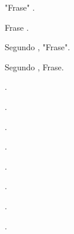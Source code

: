 \documentclass[12pt]{article}
\begin{document}
	
\par "Frase" \cite{SILVA2020}.
\par Frase \cite{SILVA2020}.
\par Segundo , "Frase".
\par Segundo , Frase. 

\par \cite{REE}.
\par {}.

\par \cite{RBEtodo}.
\par \cite{RBEn236}.
\par \cite{istoe}.
\par \cite{Singer2012}.
\par \cite{LinuxMagazine}.
\par \cite{ResumoSinape}.
	

\end{document}
